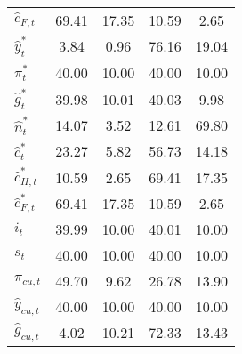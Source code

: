 \begin{center}
\begin{longtable}{lcccc}
${\hat c_{F,t}}       $	 & 	               69.41	 & 	               17.35	 & 	               10.59	 & 	                2.65 \\ 
${\hat y_t^*}         $	 & 	                3.84	 & 	                0.96	 & 	               76.16	 & 	               19.04 \\ 
${\pi_t^*}            $	 & 	               40.00	 & 	               10.00	 & 	               40.00	 & 	               10.00 \\ 
${\hat g_t^*}         $	 & 	               39.98	 & 	               10.01	 & 	               40.03	 & 	                9.98 \\ 
${\hat n_t^*}         $	 & 	               14.07	 & 	                3.52	 & 	               12.61	 & 	               69.80 \\ 
${\hat c_t^*}         $	 & 	               23.27	 & 	                5.82	 & 	               56.73	 & 	               14.18 \\ 
${\hat c_{H,t}^*}     $	 & 	               10.59	 & 	                2.65	 & 	               69.41	 & 	               17.35 \\ 
${\hat c_{F,t}^*}     $	 & 	               69.41	 & 	               17.35	 & 	               10.59	 & 	                2.65 \\ 
${i_t}                $	 & 	               39.99	 & 	               10.00	 & 	               40.01	 & 	               10.00 \\ 
${s_t}                $	 & 	               40.00	 & 	               10.00	 & 	               40.00	 & 	               10.00 \\ 
${\pi_{cu,t}}         $	 & 	               49.70	 & 	                9.62	 & 	               26.78	 & 	               13.90 \\ 
${\hat y_{cu,t}}      $	 & 	               40.00	 & 	               10.00	 & 	               40.00	 & 	               10.00 \\ 
${\hat g_{cu,t}}      $	 & 	                4.02	 & 	               10.21	 & 	               72.33	 & 	               13.43 \\ 
\end{longtable}
 \end{center}
